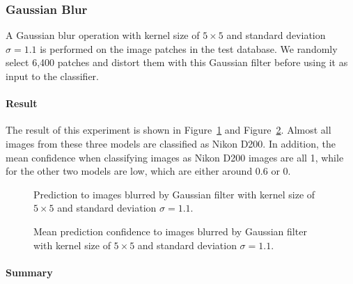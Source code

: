 \documentclass[a4paper, 9pt, twocolumn]{extarticle}
\begin{document}
\subsubsection{Gaussian Blur}
\label{section:blur}

A Gaussian blur operation with kernel size of $ 5 \times 5 $ and standard deviation $ \sigma = 1.1 $ is performed on the image patches in the test database. We randomly select 6,400 patches and distort them with this Gaussian filter before using it as input to the classifier.

\paragraph{Result}
\label{section:blur result}

The result of this experiment is shown in Figure~\ref{fig:blur result} and Figure~\ref{fig:blur confidence}. Almost all images from these three models are classified as Nikon D200. In addition, the mean confidence when classifying images as Nikon D200 images are all 1, while for the other two models are low, which are either around 0.6 or 0.

\begin{figure}
	\centering
	\resizebox{!}{!}{
		{}
	}
	\caption{Prediction to images blurred by Gaussian filter with kernel size of $ 5 \times 5 $ and standard deviation $ \sigma = 1.1 $.}
	\label{fig:blur result}
\end{figure}

\begin{figure}
	\centering
	\resizebox{!}{!}{
		{}
	}
	\caption{Mean prediction confidence to images blurred by Gaussian filter with kernel size of $ 5 \times 5 $ and standard deviation $ \sigma = 1.1 $.}
	\label{fig:blur confidence}
\end{figure}

\paragraph{Summary}
\label{section:blur summary}
\end{document}
